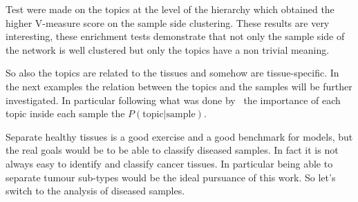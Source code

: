Test were made on the topics at the level of the hierarchy which obtained the higher V-measure score on the sample side clustering. These results are very interesting, these enrichment tests demonstrate that not only the sample side of the network is well clustered but only the topics have a non trivial meaning.

So also the topics are related to the tissues and somehow are tissue-specific. In the next examples the relation between the topics and the samples will be further investigated.
In particular following what was done by~\cite{dey2017visualizing} the importance of each topic inside each sample the $P(\text{topic} | \text{sample})$.

Separate healthy tissues is a good exercise and a good benchmark for models, but the real goals would be to be able to classify diseased samples. In fact it is not always easy to identify and classify cancer tissues. In particular being able to separate tumour sub-types would be the ideal   pursuance of this work. So let's switch to the analysis of diseased samples. 
\FloatBarrier